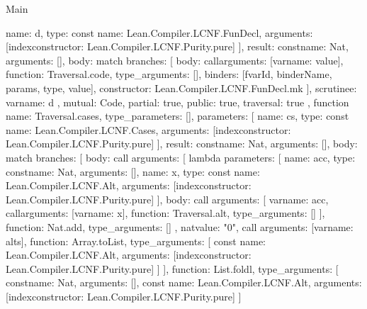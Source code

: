 \begin{lexlean}{Main}
\begin{toolingmodule}
{{        {
          name: d,
          type: const{
            name: Lean.Compiler.LCNF.FunDecl,
            arguments: [index{constructor: Lean.Compiler.LCNF.Purity.pure}]
          }
        }
      ],
      result: const{name: Nat, arguments: []},
      body: match{
        branches: [
          {
            body: call{arguments: [var{name: value}], function: Traversal.code, type_arguments: []},
            binders: [fvarId, binderName, params, type, value],
            constructor: Lean.Compiler.LCNF.FunDecl.mk
          }
        ],
        scrutinee: var{name: d}
      },
      mutual: Code,
      partial: true,
      public: true,
      traversal: true
    },
    function{
      name: Traversal.cases,
      type_parameters: [],
      parameters: [
        {
          name: cs,
          type: const{
            name: Lean.Compiler.LCNF.Cases,
            arguments: [index{constructor: Lean.Compiler.LCNF.Purity.pure}]
          }
        }
      ],
      result: const{name: Nat, arguments: []},
      body: match{
        branches: [
          {
            body: call{
              arguments: [
                lambda{
                  parameters: [
                    {name: acc, type: const{name: Nat, arguments: []}},
                    {
                      name: x,
                      type: const{
                        name: Lean.Compiler.LCNF.Alt,
                        arguments: [index{constructor: Lean.Compiler.LCNF.Purity.pure}]
                      }
                    }
                  ],
                  body: call{
                    arguments: [
                      var{name: acc},
                      call{arguments: [var{name: x}], function: Traversal.alt, type_arguments: []}
                    ],
                    function: Nat.add,
                    type_arguments: []
                  }
                },
                nat{value: "0"},
                call{
                  arguments: [var{name: alts}],
                  function: Array.toList,
                  type_arguments: [
                    const{
                      name: Lean.Compiler.LCNF.Alt,
                      arguments: [index{constructor: Lean.Compiler.LCNF.Purity.pure}]
                    }
                  ]
                }
              ],
              function: List.foldl,
              type_arguments: [
                const{name: Nat, arguments: []},
                const{
                  name: Lean.Compiler.LCNF.Alt,
                  arguments: [index{constructor: Lean.Compiler.LCNF.Purity.pure}]
                }
              ]
}}}}}
\end{toolingmodule}
\end{lexlean}
